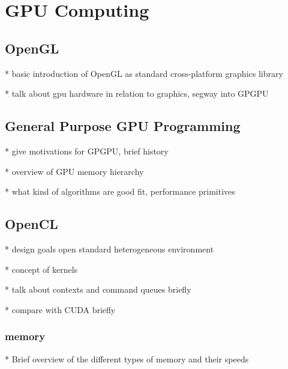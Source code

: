 \chapter{GPU Computing}

\section{OpenGL}
* basic introduction of OpenGL as standard cross-platform graphics library


* talk about gpu hardware in relation to graphics, segway into GPGPU


\section{General Purpose GPU Programming}

* give motivations for GPGPU, brief history


* overview of GPU memory hierarchy


* what kind of algorithms are good fit, performance primitives

\section{OpenCL}

* design goals
    open standard
    heterogeneous environment

* concept of kernels 


* talk about contexts and command queues briefly


* compare with CUDA briefly


\subsection{memory}
* Brief overview of the different types of memory and their speeds

